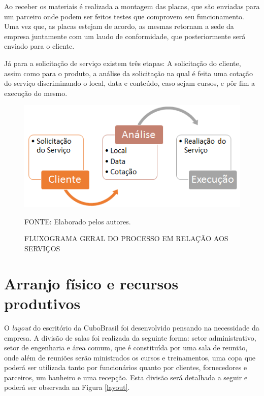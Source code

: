 \documentclass[
	12pt,				%
	openright,			%
	oneside,			%
	a4paper,			%
	english,			%
	french,				%
	spanish,			%
	brazil				%
	]{abntex2}
\begin{document}
	Ao receber os materiais é realizada a montagem das placas, que são enviadas para um parceiro onde podem ser feitos testes que comprovem seu funcionamento. Uma vez que, as placas estejam de acordo, as mesmas retornam a sede da empresa juntamente com um laudo de conformidade, que posteriormente será enviado para o cliente.
	
	Já para a solicitação de serviço existem três etapas: A solicitação do cliente, assim como para o produto, a análise da solicitação na qual é feita uma cotação do serviço discriminando o local, data e conteúdo, caso sejam cursos, e pôr fim a execução do mesmo.
	 
	 \begin{figure}[th]
		\caption{FLUXOGRAMA GERAL DO PROCESSO EM RELAÇÃO AOS SERVIÇOS}
		\label{X-1}
		\centering
		\includegraphics[width=0.8\linewidth]{./figs/X-1}
		
		\begin{small}
			FONTE: Elaborado pelos autores.
		\end{small}
	\end{figure}
	
	

\section[Arranjo físico e recursos produtivos]{Arranjo físico e recursos produtivos}

	O \textit{layout} do escritório da CuboBrasil foi desenvolvido pensando na necessidade da empresa. A divisão de salas foi realizada da seguinte forma: setor administrativo, setor de engenharia e área comum, que é constituída por uma sala de reunião, onde além de reuniões serão ministrados os cursos e treinamentos, uma copa que poderá ser utilizada tanto por funcionários quanto por clientes, fornecedores e parceiros, um banheiro e uma recepção. Esta divisão será detalhada a seguir e poderá ser observada na Figura \ref{layout}.
	
\end{document}
